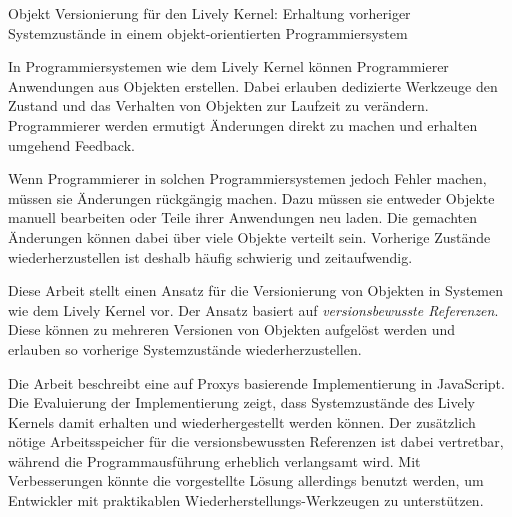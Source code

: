 \begin{zusammenfassung}

{\Large Objekt Versionierung für den Lively Kernel: Erhaltung vorheriger Systemzustände in einem objekt-orientierten Programmiersystem}

In Programmiersystemen wie dem Lively Kernel können Programmierer Anwendungen aus Objekten erstellen.
Dabei erlauben dedizierte Werkzeuge den Zustand und das Verhalten von Objekten zur Laufzeit zu verändern.
Programmierer werden ermutigt Änderungen direkt zu machen und erhalten umgehend Feedback.

Wenn Programmierer in solchen Programmiersystemen jedoch Fehler machen, müssen sie Änderungen rückgängig machen.
Dazu müssen sie entweder Objekte manuell bearbeiten oder Teile ihrer Anwendungen neu laden.
Die gemachten Änderungen können dabei über viele Objekte verteilt sein.
Vorherige Zustände wiederherzustellen ist deshalb häufig schwierig und zeitaufwendig.

Diese Arbeit stellt einen Ansatz für die Versionierung von Objekten in Systemen wie dem Lively Kernel vor.
Der Ansatz basiert auf \emph{versionsbewusste Referenzen}.
Diese können zu mehreren Versionen von Objekten aufgelöst werden und erlauben so vorherige Systemzustände wiederherzustellen.

Die Arbeit beschreibt eine auf Proxys basierende Implementierung in JavaScript.
Die Evaluierung der Implementierung zeigt, dass Systemzustände des Lively Kernels damit erhalten und wiederhergestellt werden können.
Der zusätzlich nötige Arbeitsspeicher für die versionsbewussten Referenzen ist dabei vertretbar, während die Programmausführung erheblich verlangsamt wird.
Mit Verbesserungen könnte die vorgestellte Lösung allerdings benutzt werden, um Entwickler mit praktikablen Wiederherstellungs-Werkzeugen zu unterstützen.

\end{zusammenfassung}

